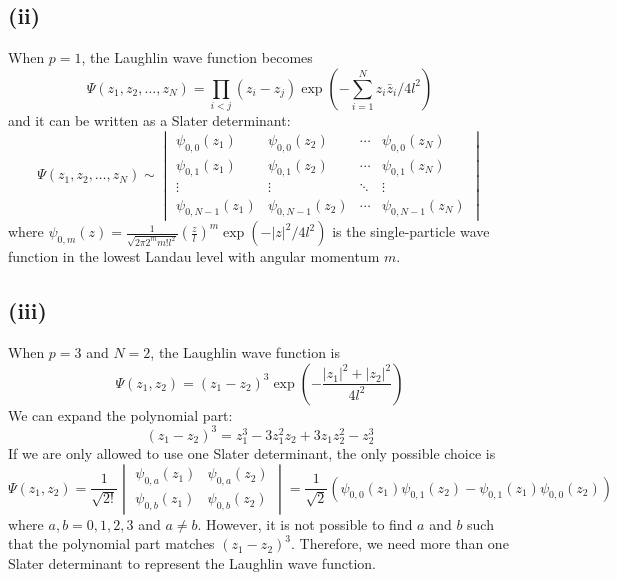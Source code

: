 \documentclass{article}
\begin{document}
\subsection*{(ii)}
When $p=1$, the Laughlin wave function becomes
\begin{equation}
    \Psi(z_1,z_2,\ldots,z_N)=\prod_{i<j}(z_i-z_j)\exp\left(-\sum_{i=1}^Nz_i \bar{z}_i/4l^2\right)
\end{equation}
and it can be written as a Slater determinant:
\begin{equation}
    \Psi(z_1,z_2,\ldots,z_N)\sim\begin{vmatrix}
        \psi_{0,0}(z_1) & \psi_{0,0}(z_2) & \cdots & \psi_{0,0}(z_N)\\
        \psi_{0,1}(z_1) & \psi_{0,1}(z_2) & \cdots & \psi_{0,1}(z_N)\\
        \vdots & \vdots & \ddots & \vdots\\
        \psi_{0,N-1}(z_1) & \psi_{0,N-1}(z_2) & \cdots & \psi_{0,N-1}(z_N)
    \end{vmatrix}
\end{equation}
where $\psi_{0,m}(z)=\frac{1}{\sqrt{2\pi 2^m m! l^{2}}}\left(\frac{z}{l}\right)^m\exp(-|z|^2/4l^2)$ is the single-particle wave function in the lowest Landau level with angular momentum $m$.

\vfill

\subsection*{(iii)}
When $p=3$ and $N=2$, the Laughlin wave function is
\begin{equation}
    \Psi(z_1,z_2)=(z_1-z_2)^3\exp\left(-\frac{|z_1|^2+|z_2|^2}{4l^2}\right)
\end{equation}
We can expand the polynomial part:
\begin{equation}
    (z_1-z_2)^3=z_1^3-3z_1^2z_2+3z_1z_2^2-z_2^3
\end{equation}
If we are only allowed to use one Slater determinant, the only possible choice is
\begin{equation}
    \Psi(z_1,z_2)=\frac{1}{\sqrt{2!}}\begin{vmatrix}
        \psi_{0,a}(z_1) & \psi_{0,a}(z_2)\\
        \psi_{0,b}(z_1) & \psi_{0,b}(z_2)
    \end{vmatrix}=\frac{1}{\sqrt{2}}(\psi_{0,0}(z_1)\psi_{0,1}(z_2)-\psi_{0,1}(z_1)\psi_{0,0}(z_2))
\end{equation}
where $a,b=0,1,2,3$ and $a\neq b$.
However, it is not possible to find $a$ and $b$ such that the polynomial part matches $(z_1-z_2)^3$.
Therefore, we need more than one Slater determinant to represent the Laughlin wave function.
\end{document}

